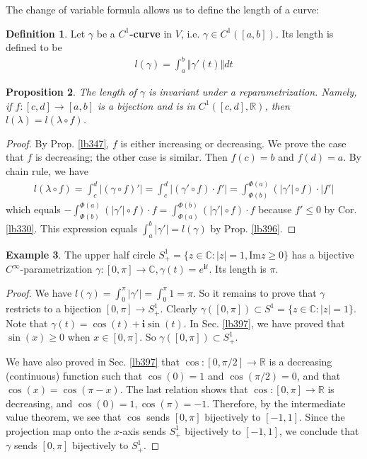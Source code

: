 \documentclass[12pt,b5paper,notitlepage]{article}
\theoremstyle{definition}
\newtheorem{df}{Definition}[section]
\newtheorem{eg}[df]{Example}
\theoremstyle{plain}
\newtheorem{pp}[df]{Proposition}
\newcommand{\im}{\mathbf{i}}
\newcommand{\Cbb}{\mathbb C}
\newcommand{\Rbb}{\mathbb R}
\newcommand{\Imag}{\mathrm{Im}}
\numberwithin{equation}{section}
\begin{document}
The change of variable formula allows us to define the length of a curve:


\begin{df}
Let $\gamma$ be a \textbf{$C^1$-curve} in $V$, i.e. $\gamma\in C^1([a,b])$. Its length  is defined to be
\begin{align*}
l(\gamma)=\int_a^b\Vert \gamma'(t)\Vert dt
\end{align*}
\end{df}

\begin{pp}
The length of $\gamma$ is invariant under a reparametrization. Namely, if $f:[c,d]\rightarrow[a,b]$ is a bijection and is in $C^1([c,d],\Rbb)$, then $l(\lambda)=l(\lambda\circ f)$.
\end{pp}

\begin{proof}
By Prop. \ref{lb347}, $f$ is either increasing or decreasing. We prove the case that $f$ is decreasing; the other case is similar. Then $f(c)=b$ and $f(d)=a$. By chain rule, we have
\begin{align*}
l(\lambda\circ f)=\int_c^d |(\gamma\circ f)'|=\int_c^d |(\gamma'\circ f)\cdot f'|=\int_{\Phi(b)}^{\Phi(a)} (|\gamma'|\circ f)\cdot |f'|
\end{align*}
which equals $-\int_{\Phi(b)}^{\Phi(a)} (|\gamma'|\circ f)\cdot f=\int_{\Phi(a)}^{\Phi(b)}(|\gamma'|\circ f)\cdot f$ because $f'\leq 0$ by Cor. \ref{lb330}. This expression equals $\int_a^b |\gamma'|=l(\gamma)$ by Prop. \ref{lb396}.
\end{proof}


\begin{eg}\label{lb398}
The upper half circle $S^1_+=\{z\in\Cbb:|z|=1,\Imag z\geq 0\}$ has a bijective $C^\infty$-parametrization $\gamma:[0,\pi]\rightarrow\Cbb,\gamma(t)=e^{\im t}$. Its length is $\pi$.
\end{eg}


\begin{proof}
We have $l(\gamma)=\int_0^\pi |\gamma'|=\int_0^\pi 1=\pi$. So it remains to prove that $\gamma$ restricts to a bijection $[0,\pi]\rightarrow S^1_+$. Clearly $\gamma([0,\pi])\subset S^1=\{z\in\Cbb:|z|=1\}$. Note that $\gamma(t)=\cos(t)+\im\sin(t)$. In Sec. \ref{lb397}, we have proved that $\sin(x)\geq0$ when $x\in[0,\pi]$. So $\gamma([0,\pi])\subset S^1_+$. 

We have also proved in Sec. \ref{lb397} that $\cos:[0,\pi/2]\rightarrow\Rbb$ is a decreasing (continuous) function such that $\cos(0)=1$ and $\cos(\pi/2)=0$, and that $\cos(x)=\cos(\pi-x)$. The last relation shows that $\cos:[0,\pi]\rightarrow\Rbb$ is decreasing, and $\cos(0)=1,\cos(\pi)=-1$. Therefore, by the intermediate value theorem, we see that $\cos$ sends $[0,\pi]$ bijectively to $[-1,1]$. Since the projection map onto the $x$-axis sends $S^1_+$ bijectively to $[-1,1]$, we conclude that $\gamma$ sends $[0,\pi]$ bijectively to $S^1_+$.
\end{proof}
\end{document}
